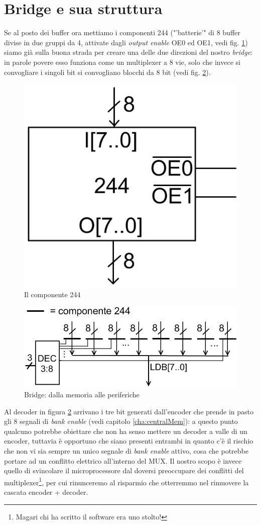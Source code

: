 \section{Bridge e sua struttura}
\label{sec:bridgeStruttura}

Se al posto dei buffer ora mettiamo i componenti 244 ("'batterie'" di 8 buffer divise in due gruppi da 4, attivate dagli \textit{output enable }OE0 ed OE1, vedi fig. \ref{fig:244}) siamo già sulla buona strada per creare una delle due direzioni del nostro \textit{bridge}: in parole povere esso funziona come un multiplexer a 8 vie, solo che invece si convogliare i singoli bit si convogliano blocchi da 8 bit (vedi fig. \ref{fig:briggiu}).

\begin{figure}[!h]
\centering
\includegraphics[width=0.35\columnwidth]{img/244}
\caption{Il componente 244}
\label{fig:244}
\end{figure}

\begin{figure}[!h]
\centering
\includegraphics[width=0.75\columnwidth]{img/briggiu}
\caption{Bridge: dalla memoria alle periferiche}
\label{fig:briggiu}
\end{figure}

Al decoder in figura \ref{fig:briggiu} arrivano i tre bit generati dall'encoder che prende in pasto gli 8 segnali di \textit{bank enable} (vedi capitolo \ref{cha:centralMem}): a questo punto qualcuno potrebbe obiettare che non ha senso mettere un decoder a valle di un encoder, tuttavia è opportuno che siano presenti entrambi in quanto c'è il rischio che non vi sia sempre un unico segnale di \textit{bank enable} attivo, cosa che potrebbe portare ad un conflitto elettrico all'interno del MUX. Il nostro scopo è invece quello di svincolare il microprocessore dal doversi preoccupare dei conflitti del multiplexer\footnote{Magari chi ha scritto il software era uno stolto!}, per cui rinunceremo al risparmio che otterremmo nel rimuovere la cascata encoder + decoder.

